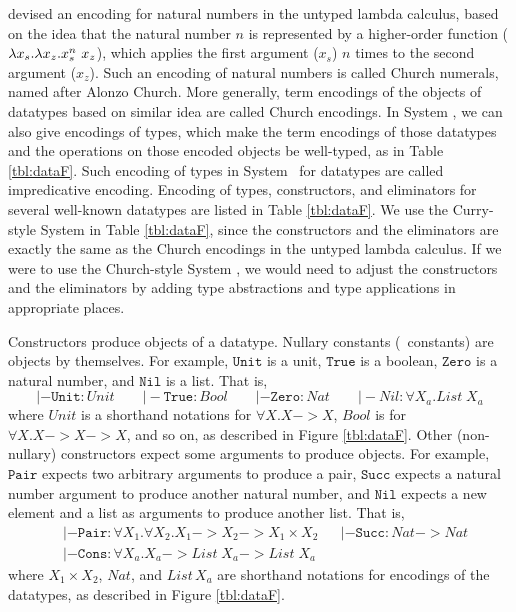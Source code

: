 \citet{Church41} devised an encoding for natural numbers
in the untyped lambda calculus, based on the idea that the natural number $n$
is represented by a higher-order function ($\lambda x_s.\lambda x_z.x_s^n~x_z$), which
applies the first argument ($x_s$) $n$ times to the second argument ($x_z$).
Such an encoding of natural numbers is called Church numerals, named after
Alonzo Church. More generally, term encodings of the objects of datatypes
based on similar idea are called Church encodings. In System \F,
we can also give encodings of types, which make the term encodings of
those datatypes and the operations on those encoded objects be well-typed,
as in Table \ref{tbl:dataF}. Such encoding of types in System \F\ for
datatypes are called impredicative encoding. Encoding of types,
constructors, and eliminators for several well-known datatypes
are listed in Table \ref{tbl:dataF}. We use the Curry-style System \F
in Table \ref{tbl:dataF}, since the constructors and the eliminators are
exactly the same as the Church encodings in the untyped lambda calculus.
If we were to use the Church-style System \F, we would need to adjust
the constructors and the eliminators by adding type abstractions and
type applications in appropriate places.

Constructors produce objects of a datatype. Nullary constants
(\aka\ constants) are objects by themselves. For example,
$\mathtt{Unit}$ is a unit, $\mathtt{True}$ is a boolean,
$\mathtt{Zero}$ is a natural number, and $\mathtt{Nil}$ is a list.
That is,
\[
|- \mathtt{Unit}:\textit{Unit} \qquad
|- \mathtt{True}:\textit{Bool} \qquad
|- \mathtt{Zero}:\textit{Nat} \qquad
|- \textit{Nil}:\forall X_a.\textit{List}\;X_a
\]
where $Unit$ is a shorthand notations for $\forall X.X -> X$, $Bool$ is
for $\forall X.X -> X -> X$, and so on, as described in Figure \ref{tbl:dataF}.
Other (non-nullary) constructors expect some arguments to produce objects.
For example, $\mathtt{Pair}$ expects two arbitrary arguments to produce a pair,
$\mathtt{Succ}$ expects a natural number argument to produce another
natural number, and $\mathtt{Nil}$ expects a new element and a list as
arguments to produce another list. That is,
\begin{align*}
& |- \mathtt{Pair} : \forall X_1. \forall X_2. X_1 -> X_2 -> X_1\times X_2
&& |- \mathtt{Succ} : \textit{Nat} -> \textit{Nat} \\ &
|- \mathtt{Cons} : \forall X_a. X_a -> \mathit{List}\;X_a -> \mathit{List}\;X_a
\end{align*}
where ${X_1 \times X_2}$, $\mathit{Nat}$, and $\mathit{List\,X_a}$
are shorthand notations for encodings of the datatypes,
as described in Figure \ref{tbl:dataF}.

